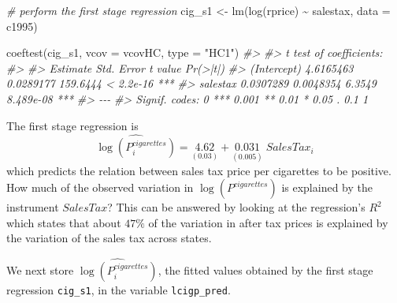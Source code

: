 \documentclass[
  14pt,
]{memoir}
\newenvironment{Shaded}{\begin{snugshade}}{\end{snugshade}}
\newcommand{\AttributeTok}[1]{\textcolor[rgb]{0.77,0.63,0.00}{#1}}
\newcommand{\CommentTok}[1]{\textcolor[rgb]{0.56,0.35,0.01}{\textit{#1}}}
\newcommand{\FunctionTok}[1]{\textcolor[rgb]{0.00,0.00,0.00}{#1}}
\newcommand{\NormalTok}[1]{#1}
\newcommand{\OtherTok}[1]{\textcolor[rgb]{0.56,0.35,0.01}{#1}}
\newcommand{\SpecialCharTok}[1]{\textcolor[rgb]{0.00,0.00,0.00}{#1}}
\newcommand{\StringTok}[1]{\textcolor[rgb]{0.31,0.60,0.02}{#1}}
\begin{document}
\begin{Shaded}
\begin{Highlighting}[]
\CommentTok{\# perform the first stage regression}
\NormalTok{cig\_s1 }\OtherTok{\textless{}{-}} \FunctionTok{lm}\NormalTok{(}\FunctionTok{log}\NormalTok{(rprice) }\SpecialCharTok{\textasciitilde{}}\NormalTok{ salestax, }\AttributeTok{data =}\NormalTok{ c1995)}

\FunctionTok{coeftest}\NormalTok{(cig\_s1, }\AttributeTok{vcov =}\NormalTok{ vcovHC, }\AttributeTok{type =} \StringTok{"HC1"}\NormalTok{)}
\CommentTok{\#\textgreater{} }
\CommentTok{\#\textgreater{} t test of coefficients:}
\CommentTok{\#\textgreater{} }
\CommentTok{\#\textgreater{}              Estimate Std. Error  t value  Pr(\textgreater{}|t|)    }
\CommentTok{\#\textgreater{} (Intercept) 4.6165463  0.0289177 159.6444 \textless{} 2.2e{-}16 ***}
\CommentTok{\#\textgreater{} salestax    0.0307289  0.0048354   6.3549 8.489e{-}08 ***}
\CommentTok{\#\textgreater{} {-}{-}{-}}
\CommentTok{\#\textgreater{} Signif. codes:  0 \textquotesingle{}***\textquotesingle{} 0.001 \textquotesingle{}**\textquotesingle{} 0.01 \textquotesingle{}*\textquotesingle{} 0.05 \textquotesingle{}.\textquotesingle{} 0.1 \textquotesingle{} \textquotesingle{} 1}
\end{Highlighting}
\end{Shaded}

The first stage regression is
\[
\widehat{\log(P_i^{cigarettes})} = \underset{(0.03)}{4.62} + \underset{(0.005)}{0.031}\; SalesTax_i
\]
which predicts the relation between sales tax price per cigarettes to be positive. How much of the observed variation in \(\log(P^{cigarettes})\) is explained by the instrument \(SalesTax\)? This can be answered by looking at the regression's \(R^2\) which states that about \(47\%\) of the variation in after tax prices is explained by the variation of the sales tax across states.

\begin{Shaded}
\end{Shaded}

We next store \(\widehat{\log(P_i^{cigarettes})}\), the fitted values obtained by the first stage regression \texttt{cig\_s1}, in the variable \texttt{lcigp\_pred}.
\end{document}
